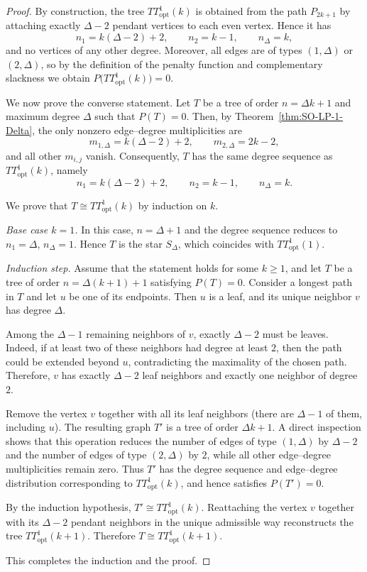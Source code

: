 \documentclass[preprint,12pt]{elsarticle}
\begin{document}
\begin{proof}
By construction, the tree $TT^1_{\mathrm{opt}}(k)$ is obtained from the path
$P_{2k+1}$ by attaching exactly $\Delta-2$ pendant vertices to each even vertex.
Hence it has
\[
n_1 = k(\Delta-2)+2,\qquad
n_2 = k-1,\qquad
n_\Delta = k,
\]
and no vertices of any other degree. %
Moreover, all edges are of types $(1,\Delta)$ or $(2,\Delta)$, so by the
definition of the penalty function and complementary slackness we obtain
$P\bigl(TT^1_{\mathrm{opt}}(k)\bigr)=0$.

We now prove the converse statement.
Let $T$ be a tree of order $n=\Delta k+1$ and maximum degree $\Delta$ such that
$P(T)=0$.
Then, by Theorem~\ref{thm:SO-LP-1-Delta}, the only nonzero edge--degree
multiplicities are
\[
m_{1,\Delta}=k(\Delta-2)+2,\qquad
m_{2,\Delta}=2k-2,
\]
and all other $m_{i,j}$ vanish.
Consequently, $T$ has the same degree sequence as $TT^1_{\mathrm{opt}}(k)$,
namely
\[
n_1=k(\Delta-2)+2,\qquad n_2=k-1,\qquad n_\Delta=k.
\]

We prove that $T\cong TT^1_{\mathrm{opt}}(k)$ by induction on $k$.

\smallskip\noindent
\emph{Base case $k=1$.}
In this case, $n=\Delta+1$ and the degree sequence reduces to
$n_1=\Delta$, $n_\Delta=1$.
Hence $T$ is the star $S_\Delta$, which coincides with $TT^1_{\mathrm{opt}}(1)$.

\medskip\noindent
\emph{Induction step.}
Assume that the statement holds for some $k\ge1$, and let $T$ be a tree of order
$n=\Delta(k+1)+1$ satisfying $P(T)=0$.
Consider a longest path in $T$ and let $u$ be one of its endpoints.
Then $u$ is a leaf, and its unique neighbor $v$ has degree $\Delta$.

Among the $\Delta-1$ remaining neighbors of $v$, exactly $\Delta-2$ must be
leaves.
Indeed, if at least two of these neighbors had degree at least $2$, then the
path could be extended beyond $u$, contradicting the maximality of the chosen
path.
Therefore, $v$ has exactly $\Delta-2$ leaf neighbors and exactly one neighbor of
degree~$2$.

Remove the vertex $v$ together with all its leaf neighbors (there are $\Delta-1$
of them, including $u$). 
The resulting graph $T'$ is a tree of order $\Delta k+1$.
A direct inspection shows that this operation reduces the number of edges of
type $(1,\Delta)$ by $\Delta-2$ and the number of edges of type $(2,\Delta)$ by
$2$, while all other edge--degree multiplicities remain zero.
Thus $T'$ has the degree sequence and edge--degree distribution corresponding to
$TT^1_{\mathrm{opt}}(k)$, and hence satisfies $P(T')=0$.

By the induction hypothesis, $T'\cong TT^1_{\mathrm{opt}}(k)$.
Reattaching the vertex $v$ together with its $\Delta-2$ pendant neighbors in the
unique admissible way reconstructs the tree $TT^1_{\mathrm{opt}}(k+1)$.
Therefore $T\cong TT^1_{\mathrm{opt}}(k+1)$.

This completes the induction and the proof.
\end{proof}
\end{document}
